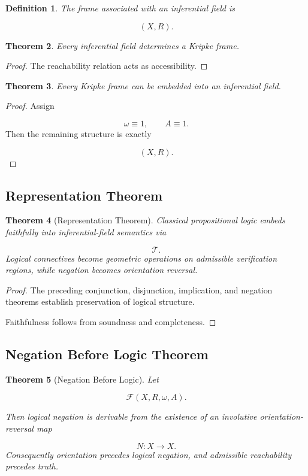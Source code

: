 \documentclass[12pt]{article}
\newtheorem{theorem}{Theorem}[section]
\newtheorem{definition}[theorem]{Definition}
\theoremstyle{remark}
\begin{document}
\begin{definition}
The frame associated with an inferential field is

\[
(X,R).
\]
\end{definition}
\begin{theorem}
Every inferential field determines a Kripke frame.
\end{theorem}

\begin{proof}
The reachability relation acts as accessibility.
\end{proof}

\begin{theorem}
Every Kripke frame can be embedded into an inferential field.
\end{theorem}

\begin{proof}
Assign

\[
\omega\equiv1,
\qquad
A\equiv1.
\]
Then the remaining structure is exactly

\[
(X,R).
\]
\end{proof}
\subsection{Representation Theorem}

\begin{theorem}[Representation Theorem]
Classical propositional logic embeds faithfully into inferential-field semantics via

\[
\mathcal T.
\]
Logical connectives become geometric operations on admissible verification regions, while negation becomes orientation reversal.
\end{theorem}

\begin{proof}
The preceding conjunction, disjunction, implication, and negation theorems establish preservation of logical structure.

Faithfulness follows from soundness and completeness.
\end{proof}

\subsection{Negation Before Logic Theorem}

\begin{theorem}[Negation Before Logic]
Let

\[
\mathcal F
(X,R,\omega,A).
\]

Then logical negation is derivable from the existence of an involutive orientation-reversal map

\[
N:X\rightarrow X.
\]
Consequently orientation precedes logical negation, and admissible reachability precedes truth.
\end{theorem}
\end{document}
